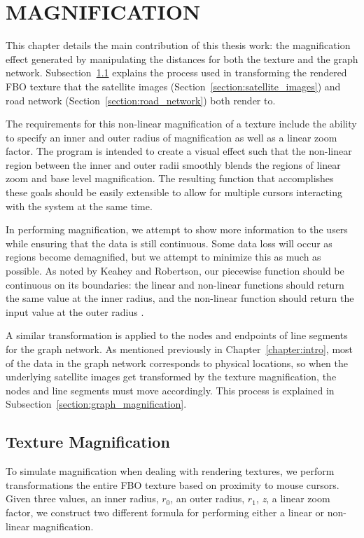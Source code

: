 \chapter{MAGNIFICATION}
\label{chapter:magnification}
This chapter details the main contribution of this thesis work: the magnification effect generated by manipulating the distances for both the texture and the graph network. Subsection~\ref{section:texture_magnification} explains the process used in transforming the rendered FBO texture that the satellite images (Section~\ref{section:satellite_images}) and road network (Section~\ref{section:road_network}) both render to.

The requirements for this non-linear magnification of a texture include the ability to specify an inner and 
outer radius of magnification as well as a linear zoom factor. The program is intended to create a visual
effect such that the non-linear region between the inner and outer radii smoothly blends the regions of linear
zoom and base level magnification. The resulting function that accomplishes these goals should be easily
extensible to allow for multiple cursors interacting with the system at the same time. 

In performing magnification, we attempt to show more information to the users while ensuring that the data is still continuous. Some data loss will occur as regions become demagnified, but we attempt to minimize this as much as possible. As noted by Keahey and Robertson, our piecewise function should be continuous on its boundaries: the linear and non-linear functions should return the same value at the inner radius, and the non-linear function should return the input
value at the outer radius \cite{Keahey1996}.

A similar transformation is applied to the nodes and endpoints of line segments for the graph network. As mentioned previously in Chapter~\ref{chapter:intro}, most of the data in the graph network corresponds to
physical locations, so when the underlying satellite images get transformed by the texture magnification, the 
nodes and line segments must move accordingly. This process is explained in 
Subsection~\ref{section:graph_magnification}.

\section{Texture Magnification}
\label{section:texture_magnification}

To simulate magnification when dealing with rendering textures, we perform transformations the entire FBO texture
based on proximity to mouse cursors. Given three values, an inner radius, \emph{$r_0$}, an outer radius, 
\emph{$r_1$}, \emph{z}, a linear zoom factor, we construct two different formula for performing either a linear 
or non-linear magnification.

